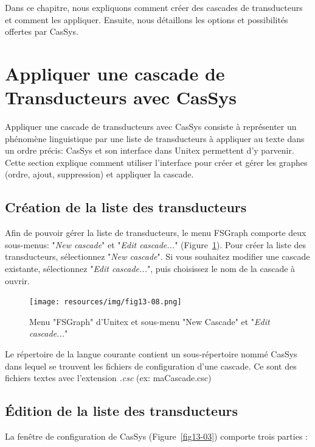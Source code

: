 \bigskip
\noindent Dans ce chapitre, nous expliquons comment créer des cascades de transducteurs et
comment les appliquer. Ensuite, nous détaillons les options et possibilités offertes par CasSys.

\section{Appliquer une cascade de Transducteurs avec CasSys}
\label{section:applyCascade}
Appliquer une cascade de transducteurs avec CasSys consiste à représenter un phénomène linguistique par une
liste de transducteurs à appliquer au texte dans un ordre précis: CasSys et son interface dans Unitex permettent d'y parvenir.
Cette section explique comment utiliser l'interface pour créer et gérer les graphes (ordre, ajout, suppression) et appliquer la cascade.   

\subsection{Création de la liste des transducteurs}
\label{subsec:listTrans}

\bigskip
\noindent Afin de pouvoir gérer la liste de transducteurs, le menu FSGraph comporte deux sous-menus:
"\textit{New cascade}" et "\textit{Edit cascade...}" (Figure~\ref{fig13-08}). Pour créer la liste des
transducteurs, sélectionnez "\textit{New cascade}". Si vous souhaitez modifier une cascade existante, sélectionnez
"\textit{Edit cascade...}", puis  choisissez le nom de la cascade à ouvrir.

\begin{figure}[!htb]
 \centering
 \texttt{[image: resources/img/fig13-08.png]}
 \caption{Menu "FSGraph" d'Unitex et sous-menu "New Cascade" et "\textit{Edit cascade...}"}
 \label{fig13-08}
\end{figure}

Le répertoire de la langue courante contient un sous-répertoire nommé CasSys dans lequel se trouvent
les fichiers de configuration d'une cascade. Ce sont des fichiers textes avec l'extension \textit{.csc} (ex: maCascade.csc)

\subsection{\'{E}dition de la liste des transducteurs}
\label{subsec:editlistTrans}

La fenêtre de configuration de CasSys (Figure~\ref{fig13-03}) comporte trois parties :

